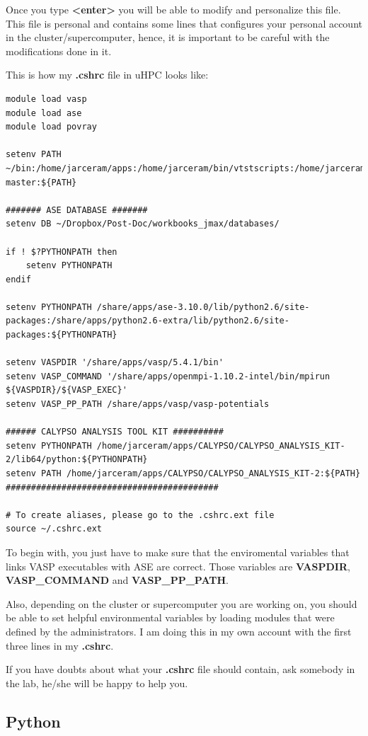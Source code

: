 \documentclass[11pt]{article}
\begin{document}
Once you type \textbf{<enter>} you will be able to modify and personalize this file. This file is personal and contains some lines that configures your personal account in the cluster/supercomputer, hence, it is important to be careful with the modifications done in it.

This is how my \textbf{.cshrc} file in uHPC looks like:
\begin{verbatim}
module load vasp
module load ase
module load povray

setenv PATH ~/bin:/home/jarceram/apps:/home/jarceram/bin/vtstscripts:/home/jarceram/bin/web_scripts:/home/jarceram/apps/VASP-master:${PATH}

####### ASE DATABASE #######
setenv DB ~/Dropbox/Post-Doc/workbooks_jmax/databases/

if ! $?PYTHONPATH then
    setenv PYTHONPATH
endif

setenv PYTHONPATH /share/apps/ase-3.10.0/lib/python2.6/site-packages:/share/apps/python2.6-extra/lib/python2.6/site-packages:${PYTHONPATH}

setenv VASPDIR '/share/apps/vasp/5.4.1/bin'
setenv VASP_COMMAND '/share/apps/openmpi-1.10.2-intel/bin/mpirun ${VASPDIR}/${VASP_EXEC}'
setenv VASP_PP_PATH /share/apps/vasp/vasp-potentials

###### CALYPSO ANALYSIS TOOL KIT ##########
setenv PYTHONPATH /home/jarceram/apps/CALYPSO/CALYPSO_ANALYSIS_KIT-2/lib64/python:${PYTHONPATH}
setenv PATH /home/jarceram/apps/CALYPSO/CALYPSO_ANALYSIS_KIT-2:${PATH}
##########################################

# To create aliases, please go to the .cshrc.ext file
source ~/.cshrc.ext
\end{verbatim}

To begin with, you just have to make sure that the enviromental variables that links VASP executables with ASE are correct. Those variables are \textbf{VASPDIR}, \textbf{VASP\_COMMAND} and \textbf{VASP\_PP\_PATH}.

Also, depending on the cluster or supercomputer you are working on, you should be able to set helpful environmental variables by loading modules that were defined by the administrators. I am doing this in my own account with the first three lines in my \textbf{.cshrc}.

If you have doubts about what your \textbf{.cshrc}  file should contain, ask somebody in the lab, he/she will be happy to help you.
\subsection{Python}
\label{sec:org2a1618e}
\end{document}
